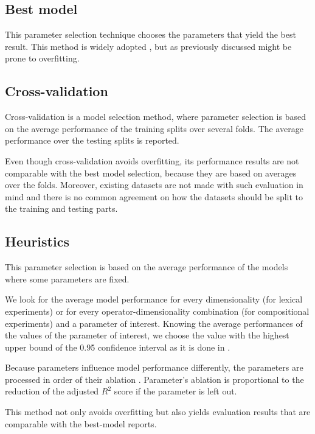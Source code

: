 \subsection{Best model}

This parameter selection technique chooses the parameters that yield the best result. This method is widely adopted \cite{mitchell-lapata:2008:ACLMain,Grefenstette:2011:ESC:2145432.2145580,milajevs-purver:2014:CVSC,milajevs-EtAl:2014:EMNLP2014}, but as previously discussed might be prone to overfitting.

\subsection{Cross-validation}

Cross-validation is a model selection method, where parameter selection is based on the average performance of the training splits over several folds. The average performance over the testing splits is reported.

Even though cross-validation avoids overfitting, its performance results are not comparable with the best model selection, because they are based on averages over the folds. Moreover, existing datasets are not made with such evaluation in mind \cite{W16-2506} and there is no common agreement on how the datasets should be split to the training and testing parts.

\subsection{Heuristics}

This parameter selection is based on the average performance of the models where some parameters are fixed.

We look for the average model performance for every dimensionality (for lexical experiments) or for every operator-dimensionality combination (for compositional experiments) and a parameter of interest. Knowing the average performances of the values of the parameter of interest, we choose the value with the highest upper bound of the 0.95 confidence interval as it is done in .

Because parameters influence model performance differently, the parameters are processed in order of their ablation \cite{lapesa2014large}. Parameter's ablation is proportional to the reduction of the adjusted $R^2$ score if the parameter is left out.

This method not only avoids overfitting but also yields evaluation results that are comparable with the best-model reports.

